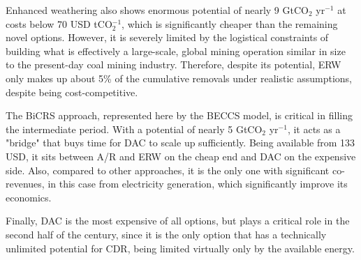 Enhanced weathering also shows enormous potential of nearly 9 GtCO$_2$ yr$^{-1}$ at costs below 70 USD tCO$_2^{-1}$, which is significantly cheaper than the remaining novel options. However, it is severely limited by the logistical constraints of building what is effectively a large-scale, global mining operation similar in size to the present-day coal mining industry. Therefore, despite its potential, ERW only makes up about 5\% of the cumulative removals under realistic assumptions, despite being cost-competitive.\vspace{2mm}

\begin{table}[h!]
\renewcommand{\arraystretch}{1.3}
\caption{Modeled cost ranges and potential of selected NETs}
\end{table}

The BiCRS approach, represented here by the BECCS model, is critical in filling the intermediate period. With a potential of nearly 5 GtCO$_2$ yr$^{-1}$, it acts as a "bridge" that buys time for DAC to scale up sufficiently. Being available from 133 USD, it sits between A/R and ERW on the cheap end and DAC on the expensive side. Also, compared to other approaches, it is the only one with significant co-revenues, in this case from electricity generation, which significantly improve its economics.\vspace{2mm}

Finally, DAC is the most expensive of all options, but plays a critical role in the second half of the century, since it is the only option that has a technically unlimited potential for CDR, being limited virtually only by the available energy.\vspace{2mm}

